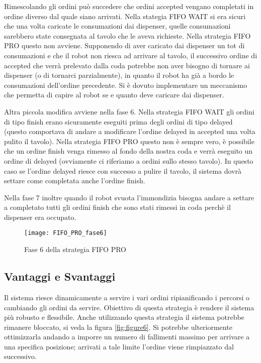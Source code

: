 Rimescolando gli ordini può succedere che ordini accepted vengano completati in ordine diverso dal quale siano arrivati. Nella stategia FIFO WAIT si era sicuri che una volta caricate le consumazioni dai dispenser, quelle consumazioni sarebbero state consegnata al tavolo che le aveva richieste. Nella strategia FIFO PRO questo non avviene. Supponendo di aver caricato dai dispenser un tot di consumazioni e che il robot non riesca ad arrivare al tavolo, il successivo ordine di accepted che verrà prelevato dalla coda potrebbe non aver bisogno di tornare ai dispenser (o di tornarci parzialmente), in quanto il robot ha già a bordo le consumazioni dell'ordine precedente. Si è dovuto implementare un meccanismo che permetta di capire al robot se e quanto deve caricare dai dispenser.

Altra piccola modifica avviene nella fase 6. Nella strategia FIFO WAIT gli ordini di tipo finish erano sicuramente eseguiti prima degli ordini di tipo delayed (questo comportava di andare a modificare l'ordine delayed in accepted una volta pulito il tavolo). Nella strategia FIFO PRO questo non è sempre vero, è possibile che un ordine finish venga rimesso al fondo della nostra coda e verrà eseguito un ordine di delayed (ovviamente ci riferiamo a ordini sullo stesso tavolo). In questo caso se l'ordine delayed riesce con successo a pulire il tavolo, il sistema dovrà settare come completata anche l'ordine finish.

Nella fase 7 inoltre quando il robot svuota l'immondizia bisogna andare a settare a completato tutti gli ordini finish che sono stati rimessi in coda perchè il dispenser era occupato.

\begin{figure}[htp]
  \texttt{[image: FIFO\_PRO\_fase6]}
  \caption{Fase 6 della strategia FIFO PRO}
  \label{fig:figure5}
\end{figure}

\subsection{Vantaggi e Svantaggi}
Il sistema riesce dinamicamente a servire i vari ordini ripianificando i percorsi o cambiando gli ordini da servire. Obiettivo di questa strategia è rendere il sistema più robusto e flessibile. 
Anche utilizzando questa strategia il sistema potrebbe rimanere bloccato, si veda la figura \ref{fig:figure6}. Si potrebbe ulteriormente ottimizzarla andando a imporre un numero di fallimenti massimo per arrivare a una specifica posizione; arrivati a tale limite l'ordine viene rimpiazzato dal successivo.


